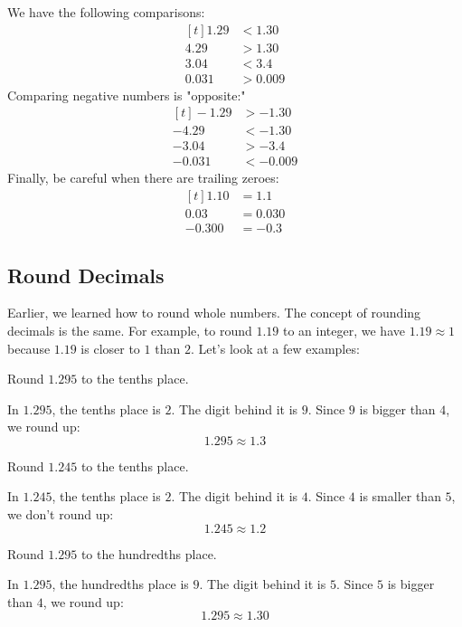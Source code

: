 We have the following comparisons:
\[
\begin{aligned}[t]
	1.29 &< 1.30 \\
	4.29 &> 1.30 \\
	3.04 &< 3.4 \\
	0.031 &> 0.009 
\end{aligned}
\]
Comparing negative numbers is "opposite:"
\[
\begin{aligned}[t]
	-1.29 &> -1.30 \\
	-4.29 &< -1.30 \\
	-3.04 &> -3.4 \\
	-0.031 &< -0.009 
\end{aligned}
\]
Finally, be careful when there are trailing zeroes:
\[
\begin{aligned}[t]
	1.10 &= 1.1 \\
	0.03 &= 0.030 \\
	-0.300 &= -0.3 
\end{aligned}
\]

\subsection{Round Decimals}
Earlier, we learned how to round whole numbers. The concept of rounding decimals is the same. For example, to round $1.19$ to an integer, we have $1.19\approx1$ because $1.19$ is closer to $1$ than $2$. Let's look at a few examples:

\begin{myexample}
Round $1.295$ to the tenths place.
\end{myexample}
\begin{solution}
In $1.295$, the tenths place is $2$. The digit behind it is $9$. Since $9$ is bigger than $4$, we round up:
\[ 1.295 \approx 1.3 \]
\end{solution}

\begin{myexample}
Round $1.245$ to the tenths place.
\end{myexample}
\begin{solution}
In $1.245$, the tenths place is $2$. The digit behind it is $4$. Since $4$ is smaller than $5$, we don't round up:
\[ 1.245 \approx 1.2 \]
\end{solution}

\begin{myexample}
Round $1.295$ to the hundredths place.
\end{myexample}
\begin{solution}
In $1.295$, the hundredths place is $9$. The digit behind it is $5$. Since $5$ is bigger than $4$, we round up:
\[ 1.295 \approx 1.30 \]
\end{solution}

